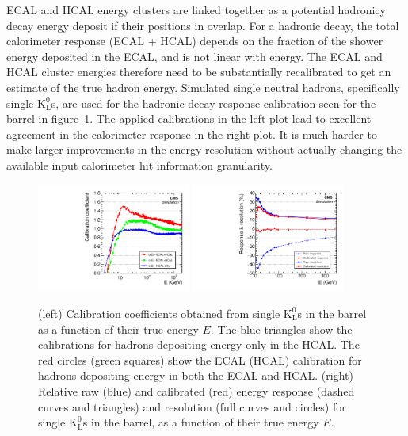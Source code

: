 ECAL and HCAL energy clusters are linked together as a potential hadronicy decay energy deposit
if their positions in \etaphi overlap. For a hadronic decay, the total calorimeter response (ECAL + HCAL) depends on 
the fraction of the shower energy deposited in the ECAL, and is not linear with energy. The 
ECAL and HCAL cluster energies therefore need to be substantially recalibrated to get an 
estimate of the true hadron energy. Simulated single neutral hadrons, specifically single 
$\text{K}^{0}_{\text{L}}$s, are used for the hadronic decay response calibration seen for the
barrel in figure~\ref{fig:pf_calo_calib}. The applied calibrations in the left plot lead
to excellent agreement in the calorimeter response in the right plot. It is much harder to
make larger improvements in the energy resolution without actually changing the available
input calorimeter hit information granularity.


\begin{figure}[htbp]
\centering
     \includegraphics[width=0.45\textwidth]{object_reconstruction_and_selection/plots/calo_calibrations.pdf}
     \includegraphics[width=0.45\textwidth]{object_reconstruction_and_selection/plots/calo_response_and_res.pdf}
     \caption{
(left) Calibration coefficients obtained from single $\text{K}^{0}_{\text{L}}$s in the barrel as a 
function of their true energy $E$. The blue triangles show the calibrations for hadrons depositing 
energy only in the HCAL. The red circles (green squares) show the ECAL (HCAL) calibration for hadrons
depositing energy in both the ECAL and HCAL.
(right) Relative raw (blue) and calibrated (red) energy response (dashed curves and triangles) and 
resolution (full curves and circles) for single $\text{K}^{0}_{\text{L}}$s in the barrel, as a 
function of their true energy $E$.
     }
     \label{fig:pf_calo_calib}
\end{figure}


